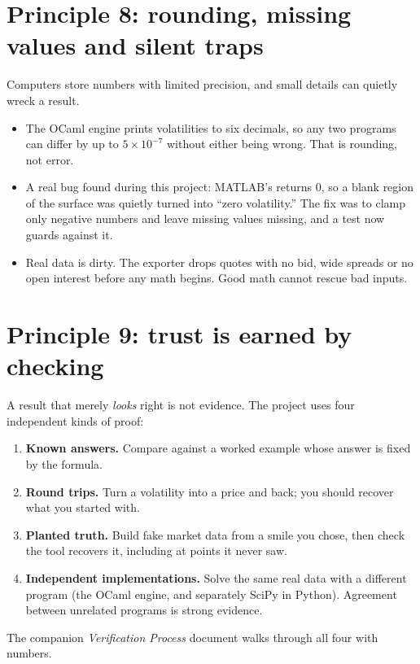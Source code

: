 \documentclass[11pt]{article}
\newcommand{\code}[1]{\texttt{\small\detokenize{#1}}}
\begin{document}
\section{Principle 8: rounding, missing values and silent traps}
Computers store numbers with limited precision, and small details can quietly wreck a result.
\begin{itemize}[leftmargin=1.5em]
\item The OCaml engine prints volatilities to six decimals, so any two programs can differ by up to $5\times10^{-7}$ without either being wrong. That is rounding, not error.
\item A real bug found during this project: MATLAB's \code{max(NaN, 0)} returns 0, so a blank region of the surface was quietly turned into ``zero volatility.'' The fix was to clamp only negative numbers and leave missing values missing, and a test now guards against it.
\item Real data is dirty. The exporter drops quotes with no bid, wide spreads or no open interest before any math begins. Good math cannot rescue bad inputs.
\end{itemize}

\section{Principle 9: trust is earned by checking}
A result that merely \emph{looks} right is not evidence. The project uses four independent kinds of proof:
\begin{enumerate}[leftmargin=1.5em]
\item \textbf{Known answers.} Compare against a worked example whose answer is fixed by the formula.
\item \textbf{Round trips.} Turn a volatility into a price and back; you should recover what you started with.
\item \textbf{Planted truth.} Build fake market data from a smile you chose, then check the tool recovers it, including at points it never saw.
\item \textbf{Independent implementations.} Solve the same real data with a different program (the OCaml engine, and separately SciPy in Python). Agreement between unrelated programs is strong evidence.
\end{enumerate}
The companion \emph{Verification Process} document walks through all four with numbers.
\end{document}
